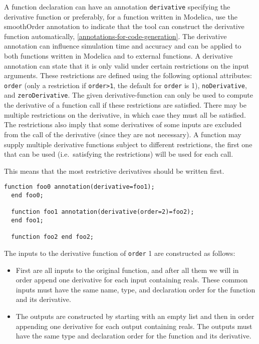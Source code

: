 A function declaration can have an annotation \lstinline!derivative! specifying the
derivative function or preferably, for a function written in Modelica,
use the smoothOrder annotation to indicate that the tool can construct
the derivative function automatically, \autoref{annotations-for-code-generation}. The derivative
annotation can influence simulation time and accuracy and can be applied
to both functions written in Modelica and to external functions. A
derivative annotation can state that it is only valid under certain
restrictions on the input arguments. These restrictions are defined
using the following optional attributes: \lstinline!order! (only a restriction if
\lstinline!order>1!, the default for \lstinline!order! is 1), \lstinline!noDerivative!, and
\lstinline!zeroDerivative!. The given derivative-function can only be used to
compute the derivative of a function call if these restrictions are
satisfied. There may be multiple restrictions on the derivative, in
which case they must all be satisfied. The restrictions also imply that
some derivatives of some inputs are excluded from the call of the
derivative (since they are not necessary). A function may supply
multiple derivative functions subject to different restrictions, the
first one that can be used (i.e.\ satisfying the restrictions) will be
used for each call.

\begin{nonnormative}
This means that the most restrictive derivatives should be written first.
\end{nonnormative}

\begin{example}
\begin{lstlisting}[language=modelica]
  function foo0 annotation(derivative=foo1);
  end foo0;

  function foo1 annotation(derivative(order=2)=foo2);
  end foo1;

  function foo2 end foo2;
\end{lstlisting}
\end{example}

The inputs to the derivative function of \lstinline!order! 1 are constructed as
follows:
\begin{itemize}
\item
  First are all inputs to the original function, and after all them we
  will in order append one derivative for each input containing reals.
  These common inputs must have the same name, type, and declaration
  order for the function and its derivative.
\item
  The outputs are constructed by starting with an empty list and then in
  order appending one derivative for each output containing reals. The
  outputs must have the same type and declaration order for the function
  and its derivative.
\end{itemize}

